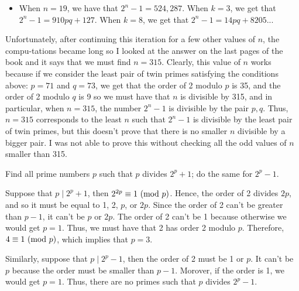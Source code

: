 \begin{solution}
\begin{itemize}
        \item When $n = 19$, we have that $2^n - 1 = 524,287$. When $k = 3$, we get that $2^n - 1 = 910pq + 127$. When $k = 8$, we get that $2^n - 1 = 14pq + 8205$...
    \end{itemize}
    Unfortunately, after continuing this iteration for a few other values of $n$, the compu-tations became long so I looked at the answer on the last pages of the book and it says that we must find $n = 315$. Clearly, this value of $n$ works because if we consider the least pair of twin primes satisfying the conditions above: $p=71$ and $q = 73$, we get that the order of 2 modulo $p$ is 35, and the order of 2 modulo $q$ is 9 so we must have that $n$ is divisible by 315, and in particular, when $n = 315$, the number $2^n - 1$ is divisible by the pair $p,q$. Thus, $n = 315$ corresponds to the least $n$ such that $2^n - 1$ is divisible by the least pair of twin primes, but this doesn't prove that there is no smaller $n$ divisible by a bigger pair. I was not able to prove this without checking all the odd values of $n$ smaller than 315. \\
\end{solution}

\begin{exercise}
    Find all prime numbers $p$ such that $p$ divides $2^p + 1$; do the same for $2^p - 1$. \\
\end{exercise}

\begin{solution}
    Suppose that $p \mid 2^p + 1$, then $2^{2p} \equiv 1 \ (\mathrm{mod}\ p)$. Hence, the order of 2 divides $2p$, and so it must be equal to 1, 2, $p$, or $2p$. Since the order of 2 can't be greater than $p-1$, it can't be $p$ or $2p$. The order of 2 can't be 1 because otherwise we would get $p= 1$. Thus, we must have that 2 has order 2 modulo $p$. Therefore, $4\equiv 1 \ (\mathrm{mod}\ p)$, which implies that $p = 3$.
    
    Similarly, suppose that $p \mid 2^p - 1$, then the order of 2 must be 1 or $p$. It can't be $p$ because the order must be smaller than $p-1$. Morover, if the order is 1, we would get $p = 1$. Thus, there are no primes such that $p$ divides $2^p - 1$.\\
\end{solution}

